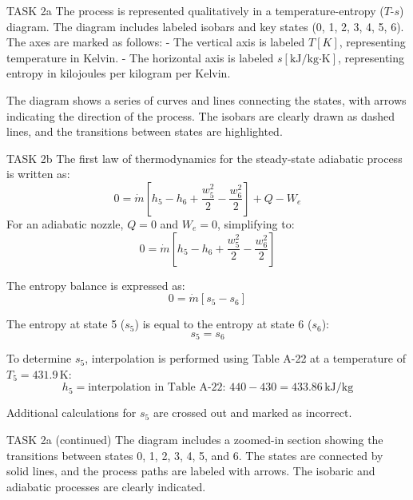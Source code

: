 TASK 2a  
The process is represented qualitatively in a temperature-entropy (\(T\)-\(s\)) diagram. The diagram includes labeled isobars and key states (0, 1, 2, 3, 4, 5, 6). The axes are marked as follows:  
- The vertical axis is labeled \(T [K]\), representing temperature in Kelvin.  
- The horizontal axis is labeled \(s [\text{kJ}/\text{kg·K}]\), representing entropy in kilojoules per kilogram per Kelvin.  

The diagram shows a series of curves and lines connecting the states, with arrows indicating the direction of the process. The isobars are clearly drawn as dashed lines, and the transitions between states are highlighted.  

TASK 2b  
The first law of thermodynamics for the steady-state adiabatic process is written as:  
\[
0 = \dot{m} \left[ h_5 - h_6 + \frac{w_5^2}{2} - \frac{w_6^2}{2} \right] + Q - W_e
\]  
For an adiabatic nozzle, \(Q = 0\) and \(W_e = 0\), simplifying to:  
\[
0 = \dot{m} \left[ h_5 - h_6 + \frac{w_5^2}{2} - \frac{w_6^2}{2} \right]
\]  

The entropy balance is expressed as:  
\[
0 = \dot{m} \left[ s_5 - s_6 \right]
\]  

The entropy at state 5 (\(s_5\)) is equal to the entropy at state 6 (\(s_6\)):  
\[
s_5 = s_6
\]  

To determine \(s_5\), interpolation is performed using Table A-22 at a temperature of \(T_5 = 431.9 \, \text{K}\):  
\[
h_5 = \text{interpolation in Table A-22: } 440 - 430 = 433.86 \, \text{kJ/kg}
\]  

Additional calculations for \(s_5\) are crossed out and marked as incorrect.  

TASK 2a (continued)  
The diagram includes a zoomed-in section showing the transitions between states 0, 1, 2, 3, 4, 5, and 6. The states are connected by solid lines, and the process paths are labeled with arrows. The isobaric and adiabatic processes are clearly indicated.